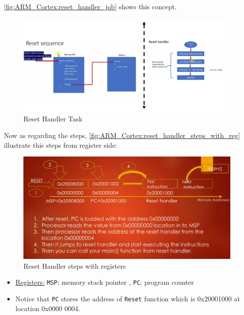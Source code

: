 \autoref{fig:ARM_Cortex:reset_handler_job} shows this concept.

\begin{figure}[h]
\centering
\includegraphics[scale=0.55]{Figures/ARM_Cortex/reset_handler_job}
\caption{Reset Handler Task}
\label{fig:ARM_Cortex:reset_handler_job}
\end{figure}


Now as regarding the steps, \autoref{fig:ARM_Cortex:reset_handler_steps_with_reg} illustrate this steps from register side:

\begin{figure}[h]
\centering
\includegraphics[scale=0.55]{Figures/ARM_Cortex/reset_handler_steps_with_reg}
\caption{Reset Handler steps with registers}
\label{fig:ARM_Cortex:reset_handler_steps_with_reg}
\end{figure}

\begin{itemize}

    \item \underline{Registers:} \verb|MSP|: memory stack pointer , \verb|PC|: program counter
    
    \item Notice that \verb|PC| stores the address of \verb|Reset| function which is 0x20001000 at location 0x0000 0004.
\end{itemize}


